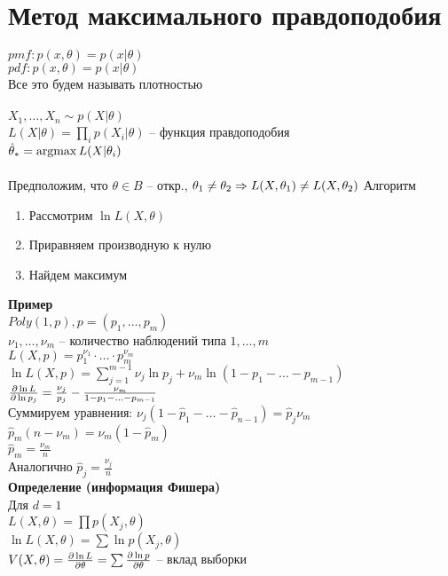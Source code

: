 \documentclass[12pt]{article}
\begin{document}
\section{Метод максимального правдоподобия}
$pmf: p(x, \theta) = p(x|\theta)$\\
$pdf: p(x, \theta) = p(x|\theta)$\\
Все это будем называть плотностью\\\\
$X_1, \ldots, X_n \sim p(X|\theta)$\\
$L(X|\theta) = \prod_i p(X_i|\theta)$ -- функция правдоподобия\\
$\hat \theta_* = \operatorname{argmax} L(X|\theta_i)$\\\\
Предположим, что $\theta \in B$ -- откр., $\theta_1 \neq \theta_2 \Rightarrow L(X, \theta_1) \neq L(X, \theta_2)$
Алгоритм
\begin{enumerate}
	\item Рассмотрим $\ln L(X, \theta)$
	\item Приравняем производную к нулю
	\item Найдем максимум
\end{enumerate}
\textbf{Пример}\\
$Poly(1, p), p = (p_1, \ldots, p_m)$\\
$\nu_1, \ldots, \nu_m$ -- количество наблюдений типа $1, \ldots, m$\\
$L(X, p) = p_1^{\nu_1} \cdot \ldots \cdot p_m^{\nu_m}$\\
$\ln L(X, p) = \sum_{j=1}^{m-1} \nu_j \ln p_j + \nu_m \ln (1 - p_1 -\ldots - p_{m-1})$\\
$\frac{\partial \ln L}{\partial \ln p_j} = \frac{\nu_j}{p_j} - \frac{\nu_m}{1-p_1 - \ldots - p_{m-1}}$\\
Суммируем уравнения: $\nu_j (1 - \hat p_1 -\ldots - \hat p_{n-1}) = \hat p_j \nu_m$\\
$\hat p_m (n - \nu_m) = \nu_m (1-\hat p_m)$\\
$\hat p_m = \frac{\nu_m}{n}$\\
Аналогично $\hat p_j = \frac{\nu_j}{n}$\\
\textbf{Определение (информация Фишера)}\\
Для $d=1$\\
$L(X, \theta) = \prod p(X_j, \theta)$\\
$\ln L(X, \theta) = \sum \ln p(X_j, \theta)$\\
$V(X,\theta) = \frac{\partial \ln L}{\partial \theta} = \sum \frac{\partial \ln p}{\partial \theta}$ -- вклад выборки\\
\end{document}
